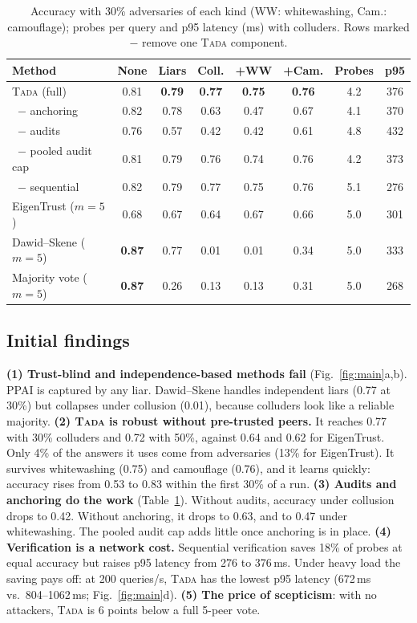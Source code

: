 \documentclass[conference]{IEEEtran}
\newcommand{\tada}{\textup{\textsc{Tada}}}
\begin{document}
\begin{table}[t]
\centering
\caption{Accuracy with 30\% adversaries of each kind (WW: whitewashing, Cam.: camouflage);
probes per query and p95 latency (ms) with colluders. Rows marked $-$ remove one \tada{} component.}
\label{tab:abl}
\footnotesize
\setlength{\tabcolsep}{2.6pt}
\begin{tabular}{@{}lccccccc@{}}
\toprule
Method & None & Liars & Coll. & +WW & +Cam. & Probes & p95\\
\midrule
\tada{} (full) & 0.81 & \textbf{0.79} & \textbf{0.77} & \textbf{0.75} & \textbf{0.76} & 4.2 & 376\\
\ $-$ anchoring & 0.82 & 0.78 & 0.63 & 0.47 & 0.67 & 4.1 & 370\\
\ $-$ audits & 0.76 & 0.57 & 0.42 & 0.42 & 0.61 & 4.8 & 432\\
\ $-$ pooled audit cap & 0.81 & 0.79 & 0.76 & 0.74 & 0.76 & 4.2 & 373\\
\ $-$ sequential & 0.82 & 0.79 & 0.77 & 0.75 & 0.76 & 5.1 & 276\\
\midrule
EigenTrust ($m{=}5$) & 0.68 & 0.67 & 0.64 & 0.67 & 0.66 & 5.0 & 301\\
Dawid--Skene ($m{=}5$) & \textbf{0.87} & 0.77 & 0.01 & 0.01 & 0.34 & 5.0 & 333\\
Majority vote ($m{=}5$) & \textbf{0.87} & 0.26 & 0.13 & 0.13 & 0.31 & 5.0 & 268\\
\bottomrule
\end{tabular}
\end{table}

\subsection{Initial findings}
\textbf{(1) Trust-blind and independence-based methods fail} (Fig.~\ref{fig:main}a,b). PPAI is
captured by any liar. Dawid--Skene handles independent liars (0.77 at 30\%) but collapses under
collusion (0.01), because colluders look like a reliable majority.
\textbf{(2) \tada{} is robust without pre-trusted peers.} It reaches 0.77 with 30\% colluders and
0.72 with 50\%, against 0.64 and 0.62 for EigenTrust. Only 4\% of the answers it uses come from
adversaries (13\% for EigenTrust). It survives whitewashing (0.75) and camouflage (0.76), and it
learns quickly: accuracy rises from 0.53 to 0.83 within the first 30\% of a run.
\textbf{(3) Audits and anchoring do the work} (Table~\ref{tab:abl}). Without audits, accuracy under
collusion drops to 0.42. Without anchoring, it drops to 0.63, and to 0.47 under whitewashing. The
pooled audit cap adds little once anchoring is in place.
\textbf{(4) Verification is a network cost.} Sequential verification saves 18\% of probes at equal
accuracy but raises p95 latency from 276 to 376\,ms. Under heavy load the saving pays off: at
200 queries/s, \tada{} has the lowest p95 latency (672\,ms vs.\ 804--1062\,ms; Fig.~\ref{fig:main}d).
\textbf{(5) The price of scepticism}: with no attackers, \tada{} is 6 points below a full 5-peer vote.
\end{document}
